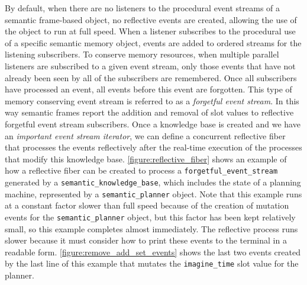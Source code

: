 By default, when there are no listeners to the procedural event
streams of a semantic frame-based object, no reflective events are
created, allowing the use of the object to run at full speed.  When a
listener subscribes to the procedural use of a specific semantic
memory object, events are added to ordered streams for the listening
subscribers.  To conserve memory resources, when multiple parallel
listeners are subscribed to a given event stream, only those events
that have not already been seen by all of the subscribers are
remembered.  Once all subscribers have processed an event, all events
before this event are forgotten.  This type of memory conserving event
stream is referred to as a {\emph{forgetful event stream}}.  In this
way semantic frames report the addition and removal of slot values to
reflective forgetful event stream subscribers.  Once a knowledge base
is created and we have an {\emph{important event stream iterator}}, we
can define a concurrent reflective fiber that processes the events
reflectively after the real-time execution of the processes that
modify this knowledge base.
{\mbox{\autoref{figure:reflective_fiber}}} shows an example of how a
reflective fiber can be created to process a
{\tt{forgetful\_event\_stream}} generated by a
{\tt{semantic\_knowledge\_base}}, which includes the state of a
planning machine, represented by a {\tt{semantic\_planner}} object.
Note that this example runs at a constant factor slower than full
speed because of the creation of mutation events for the
{\tt{semantic\_planner}} object, but this factor has been kept
relatively small, so this example completes almost immediately.  The
reflective process runs slower because it must consider how to print
these events to the terminal in a readable form.
{\mbox{\autoref{figure:remove_add_set_events}}} shows the last two
events created by the last line of this example that mutates the
{\tt{imagine\_time}} slot value for the planner.
